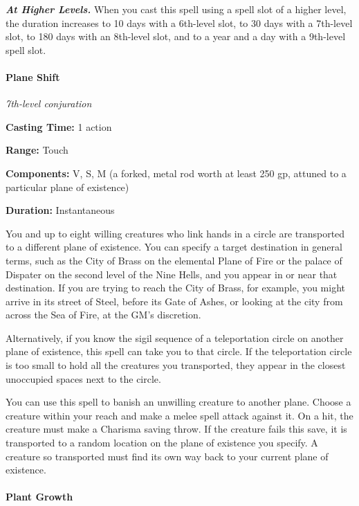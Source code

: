 \documentclass[
]{article}
\begin{document}
\emph{\textbf{At Higher Levels.}} When you cast this spell using a spell
slot of a higher level, the duration increases to 10 days with a
6th-level slot, to 30 days with a 7th-level slot, to 180 days with an
8th-level slot, and to a year and a day with a 9th-level spell slot.

\hypertarget{plane-shift}{%
\paragraph{Plane Shift}\label{plane-shift}}

\emph{7th-level conjuration}

\textbf{Casting Time:} 1 action

\textbf{Range:} Touch

\textbf{Components:} V, S, M (a forked, metal rod worth at least 250 gp,
attuned to a particular plane of existence)

\textbf{Duration:} Instantaneous

You and up to eight willing creatures who link hands in a circle are
transported to a different plane of existence. You can specify a target
destination in general terms, such as the City of Brass on the elemental
Plane of Fire or the palace of Dispater on the second level of the Nine
Hells, and you appear in or near that destination. If you are trying to
reach the City of Brass, for example, you might arrive in its street of
Steel, before its Gate of Ashes, or looking at the city from across the
Sea of Fire, at the GM's discretion.

Alternatively, if you know the sigil sequence of a teleportation circle
on another plane of existence, this spell can take you to that circle.
If the teleportation circle is too small to hold all the creatures you
transported, they appear in the closest unoccupied spaces next to the
circle.

You can use this spell to banish an unwilling creature to another plane.
Choose a creature within your reach and make a melee spell attack
against it. On a hit, the creature must make a Charisma saving throw. If
the creature fails this save, it is transported to a random location on
the plane of existence you specify. A creature so transported must find
its own way back to your current plane of existence.

\hypertarget{plant-growth}{%
\paragraph{Plant Growth}\label{plant-growth}}
\end{document}
